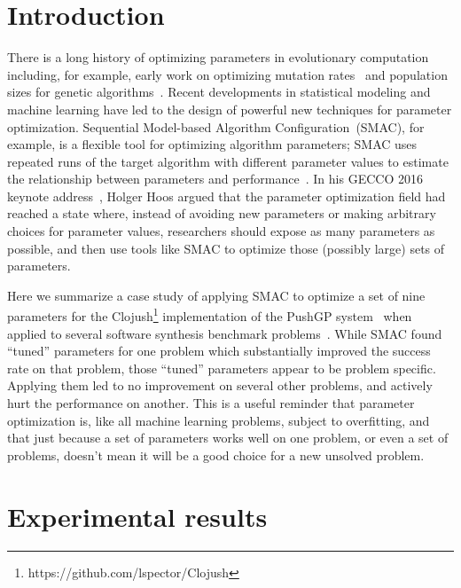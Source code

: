 \section{Introduction}
\label{sec:introduction}

There is a long history of optimizing parameters in evolutionary 
computation~\cite{lobo2007parameter}
including, for example, early work on optimizing mutation 
rates~\cite{back1993optimal} and population sizes for genetic algorithms~\cite{alander1992optimal}.
Recent developments in statistical modeling and machine learning have
led to the design of powerful new techniques for parameter optimization. 
Sequential Model-based Algorithm Configuration~(SMAC), for example, is a
 flexible tool for optimizing algorithm parameters; SMAC uses repeated runs
of the target algorithm with different parameter values to estimate
the relationship between parameters and performance~\cite{HutHooLey11-SMAC}. In his GECCO 2016 keynote 
address~\cite{Hoos:2016:TCM:2908812.2908960}, Holger Hoos argued
that the parameter optimization field had reached a state where, 
instead of avoiding new
parameters or making arbitrary choices for parameter values, researchers
should expose as many parameters as possible, and then use tools like
SMAC to optimize those (possibly large) sets of parameters.

Here we summarize a case study of applying SMAC to optimize a
set of nine parameters for the Clojush\footnote{https://github.com/lspector/Clojush} 
implementation of the PushGP system~\cite{spector:2002:GPEM,push3gecco}
when applied to several software synthesis 
benchmark problems~\cite{Helmuth:2015:GECCO}. While SMAC found
``tuned'' parameters for one problem which substantially improved
the success rate on that problem, those ``tuned'' parameters appear to
be problem specific. Applying them led to no improvement on several other
problems, and actively hurt the performance on another. This is a useful
reminder that parameter optimization is, like all machine learning problems,
subject to overfitting, and that just because a set of parameters works 
well on one problem, or even a set of problems, doesn't mean it will be
a good choice for a new unsolved problem.

\section{Experimental results}
\label{sec:experiments}

